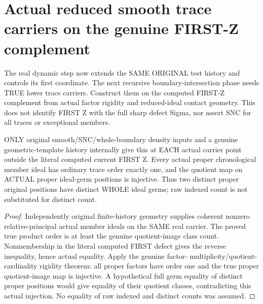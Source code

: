 \section{Actual reduced smooth trace carriers on the genuine FIRST-Z complement}

The real dynamic step now extends the SAME ORIGINAL test history and
controls its first coordinate. The next recursive boundary-intersection
phase needs TRUE lower trace carriers. Construct them on the computed
FIRST-Z complement from actual factor rigidity and reduced-ideal contact
geometry. This does not identify FIRST Z with the full sharp defect Sigma,
nor assert SNC for all traces or exceptional members.

\begin{lemma}
\label{hir:sharp-actual-first-good-chronological-factor-rigidity}
\leanok
ONLY original smooth/SNC/whole-boundary density inputs and a genuine
geometric-template history internally give this at EACH actual carrier
point outside the literal computed current FIRST Z. Every actual proper
chronological member ideal has ordinary trace order exactly one, and the
quotient map on ACTUAL proper ideal-germ positions is injective. Thus two
distinct proper original positions have distinct WHOLE ideal germs; raw
indexed count is not substituted for distinct count.
\end{lemma}
\begin{proof}
Independently original finite-history geometry supplies coherent nonzero
relative-principal actual member ideals on the SAME real carrier. The
proved true product order is at least the genuine quotient-image class
count. Nonmembership in the literal computed FIRST defect gives the
reverse inequality, hence actual equality. Apply the genuine factor-
multiplicity/quotient-cardinality rigidity theorem: all proper factors
have order one and the true proper quotient-image map is injective.
A hypothetical full germ equality of distinct proper positions would
give equality of their quotient classes, contradicting this actual
injection. No equality of raw indexed and distinct counts was assumed.
\end{proof}

